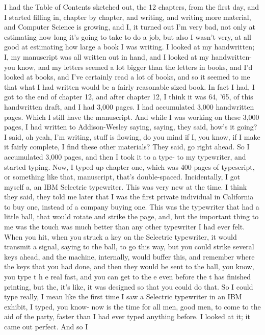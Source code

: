 \documentclass[]{article}
\begin{document}
I had the Table of Contents sketched out, the 12 chapters, from the
first day, and I started filling in, chapter by chapter, and writing,
and writing more material, and Computer Science is growing, and I, it
turned out I'm very bad, not only at estimating how long it's going to
take to do a job, but also I wasn't very, at all good at estimating how
large a book I was writing. I looked at my handwritten; I, my manuscript
was all written out in hand, and I looked at my handwritten- you know,
and my letters seemed a lot bigger than the letters in books, and I'd
looked at books, and I've certainly read a lot of books, and so it
seemed to me that what I had written would be a fairly reasonable sized
book. In fact I had, I got to the end of chapter 12, and after chapter
12, I think it was 64, '65, of this handwritten draft, and I had 3,000
pages. I had accumulated 3,000 handwritten pages. Which I still have the
manuscript. And while I was working on these 3,000 pages, I had written
to Addison-Wesley saying, saying, they said, how's it going? I said, oh
yeah, I'm writing, stuff is flowing, do you mind if I, you know, if I
make it fairly complete, I find these other materials? They said, go
right ahead. So I accumulated 3,000 pages, and then I took it to a type-
to my typewriter, and started typing. Now, I typed up chapter one, which
was 400 pages of typescript, or something like that, manuscript, that's
double-spaced. Incidentally, I got myself a, an IBM Selectric
typewriter. This was very new at the time. I think they said, they told
me later that I was the first private individual in California to buy
one, instead of a company buying one. This was the typewriter that had a
little ball, that would rotate and strike the page, and, but the
important thing to me was the touch was much better than any other
typewriter I had ever felt. When you hit, when you struck a key on the
Selectric typewriter, it would transmit a signal, saying to the ball, to
go this way, but you could strike several keys ahead, and the machine,
internally, would buffer this, and remember where the keys that you had
done, and then they would be sent to the ball, you know, you type t h e
real fast, and you can get to the e even before the t has finished
printing, but the, it's like, it was designed so that you could do that.
So I could type really, I mean like the first time I saw a Selectric
typewriter in an IBM exhibit, I typed, you know- now is the time for all
men, good men, to come to the aid of the party, faster than I had ever
typed anything before. I looked at it; it came out perfect. And so I
\end{document}
